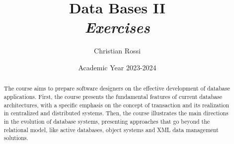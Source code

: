 \documentclass[12pt, a4paper]{report}
\title{Data Bases II \\ \textit{Exercises}}
\author{Christian Rossi}
\date{Academic Year 2023-2024}
\newtheorem[style=M,bodystyle=\normalfont]{theorem}{Theorem}
\newtheorem[style=M,bodystyle=\normalfont]{corollary}{Corollary}
\newtheorem[style=M,bodystyle=\normalfont]{lemma}{Lemma}
\newtheorem[style=M,bodystyle=\normalfont]{definition}{Definition}
\begin{document}
\maketitle

\newpage

\begin{abstract}
    The course aims to prepare software designers on the effective development of database applications. First, the course presents the fundamental features of current database 
    architectures, with a specific emphasis on the concept of transaction and its realization in centralized and distributed systems. Then, the course illustrates the main directions 
    in the evolution of database systems, presenting approaches that go beyond the relational model, like active databases, object systems and XML data management solutions.
\end{abstract}

\newpage

\tableofcontents

\newpage
\end{document}
